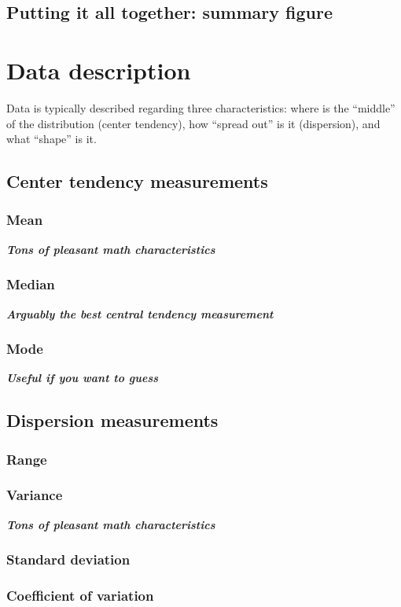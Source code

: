 \documentclass{report}
\newcommand{\notefor}[1]{\hfill\textbf{\textit{#1}}}
\begin{document}
	\section{Putting it all together: summary figure}
	
	
\chapter{Data description}
Data is typically described regarding three characteristics: where is the ``middle'' of the distribution (center tendency), how ``spread out'' is it (dispersion), and what ``shape'' is it.

	\section{Center tendency measurements}
		\subsection{Mean}
		\notefor{Tons of pleasant math characteristics}
		
		\subsection{Median}
		\notefor{Arguably the best central tendency measurement}
		
		\subsection{Mode}
		\notefor{Useful if you want to guess}
		
	\section{Dispersion measurements}
		\subsection{Range}
		\subsection{Variance}
		\notefor{Tons of pleasant math characteristics}
		
		\subsection{Standard deviation}
		\subsection{Coefficient of variation}
\end{document}
